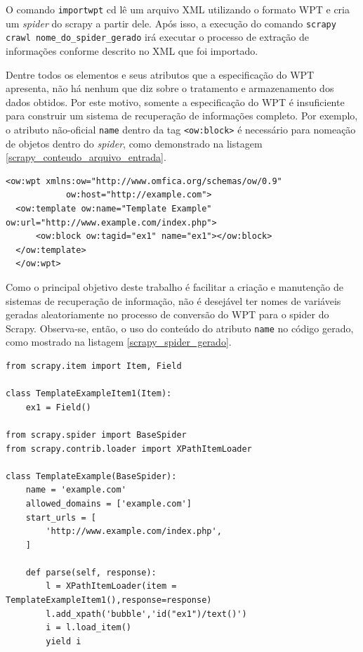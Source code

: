O comando \texttt{importwpt} cd lê um arquivo XML utilizando o formato WPT e cria um \emph{spider} do scrapy a partir dele. Após isso, a execução do comando \texttt{scrapy crawl nome\_do\_spider\_gerado} irá executar o processo de extração de informações conforme descrito no XML que foi importado.

Dentre todos os elementos e seus atributos que a especificação do WPT apresenta, não há nenhum que diz sobre o tratamento e armazenamento dos dados obtidos. Por este motivo, somente a especificação do WPT é insuficiente para construir um sistema de recuperação de informações completo. Por exemplo, o atributo não-oficial \texttt{name} dentro da tag \texttt{<ow:block>} é necessário para nomeação de objetos dentro do \emph{spider}, como demonstrado na listagem \ref{scrapy_conteudo_arquivo_entrada}.

\begin{lstlisting}[label=scrapy_conteudo_arquivo_entrada]
  <ow:wpt xmlns:ow="http://www.omfica.org/schemas/ow/0.9"
            ow:host="http://example.com">
  <ow:template ow:name="Template Example" ow:url="http://www.example.com/index.php">
      <ow:block ow:tagid="ex1" name="ex1"></ow:block>
  </ow:template> 
  </ow:wpt>
\end{lstlisting}

Como o principal objetivo deste trabalho é facilitar a criação e manutenção de sistemas de recuperação de informação, não é desejável ter nomes de variáveis geradas aleatoriamente no processo de conversão do WPT para o spider do Scrapy. Observa-se, então, o uso do conteúdo do atributo \texttt{name} no código gerado, como mostrado na listagem \ref{scrapy_spider_gerado}.

\begin{lstlisting}[label=scrapy_spider_gerado]
from scrapy.item import Item, Field

class TemplateExampleItem1(Item):
    ex1 = Field()

from scrapy.spider import BaseSpider
from scrapy.contrib.loader import XPathItemLoader

class TemplateExample(BaseSpider):
    name = 'example.com'
    allowed_domains = ['example.com']
    start_urls = [
        'http://www.example.com/index.php',
    ]

    def parse(self, response):
        l = XPathItemLoader(item = TemplateExampleItem1(),response=response)
        l.add_xpath('bubble','id("ex1")/text()') 
        i = l.load_item()
        yield i

\end{lstlisting}


